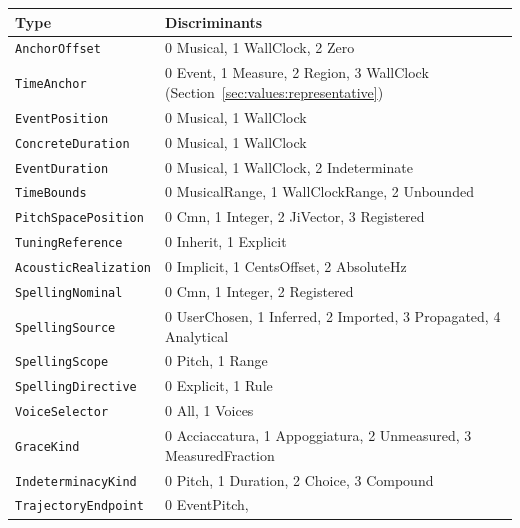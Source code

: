 \documentclass[11pt,letterpaper]{report}
\newcommand{\tablenums}[1]{{\addfontfeatures{Numbers={Lining,Tabular}}#1}}
\begin{document}
\begingroup\small
\begin{longtable}{p{1.9in} p{3.7in}}
  \toprule
  \textbf{Type} & \textbf{Discriminants} \\
  \midrule
  \endhead
  \texttt{AnchorOffset} & \tablenums{0} Musical, \tablenums{1} WallClock,
    \tablenums{2} Zero \\
  \texttt{TimeAnchor} & \tablenums{0} Event, \tablenums{1} Measure,
    \tablenums{2} Region, \tablenums{3} WallClock
    (Section~\ref{sec:values:representative}) \\
  \texttt{EventPosition} & \tablenums{0} Musical, \tablenums{1} WallClock \\
  \texttt{ConcreteDuration} & \tablenums{0} Musical, \tablenums{1} WallClock \\
  \texttt{EventDuration} & \tablenums{0} Musical, \tablenums{1} WallClock,
    \tablenums{2} Indeterminate \\
  \texttt{TimeBounds} & \tablenums{0} MusicalRange,
    \tablenums{1} WallClockRange, \tablenums{2} Unbounded \\
  \texttt{PitchSpacePosition} & \tablenums{0} Cmn, \tablenums{1} Integer,
    \tablenums{2} JiVector, \tablenums{3} Registered \\
  \texttt{TuningReference} & \tablenums{0} Inherit, \tablenums{1} Explicit \\
  \texttt{AcousticRealization} & \tablenums{0} Implicit,
    \tablenums{1} CentsOffset, \tablenums{2} AbsoluteHz \\
  \texttt{SpellingNominal} & \tablenums{0} Cmn, \tablenums{1} Integer,
    \tablenums{2} Registered \\
  \texttt{SpellingSource} & \tablenums{0} UserChosen, \tablenums{1} Inferred,
    \tablenums{2} Imported, \tablenums{3} Propagated,
    \tablenums{4} Analytical \\
  \texttt{SpellingScope} & \tablenums{0} Pitch, \tablenums{1} Range \\
  \texttt{SpellingDirective} & \tablenums{0} Explicit, \tablenums{1} Rule \\
  \texttt{VoiceSelector} & \tablenums{0} All, \tablenums{1} Voices \\
  \texttt{GraceKind} & \tablenums{0} Acciaccatura, \tablenums{1} Appoggiatura,
    \tablenums{2} Unmeasured, \tablenums{3} MeasuredFraction \\
  \texttt{IndeterminacyKind} & \tablenums{0} Pitch, \tablenums{1} Duration,
    \tablenums{2} Choice, \tablenums{3} Compound \\
  \texttt{TrajectoryEndpoint} & \tablenums{0} EventPitch,

\end{longtable}
\end{document}
